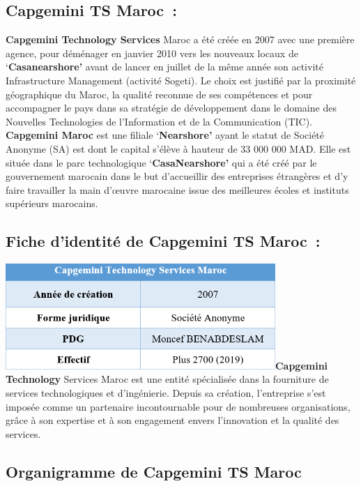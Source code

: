 \documentclass[12pt,a4paper,twoside]{report}
\begin{document}
\hypertarget{capgemini-ts-maroc}{%
\subsection{Capgemini TS Maroc~:}\label{capgemini-ts-maroc}}

\textbf{Capgemini Technology Services} Maroc a été créée en 2007 avec
une première agence, pour déménager en janvier 2010 vers les nouveaux
locaux de `\textbf{Casanearshore'} avant de lancer en juillet de la même
année son activité Infrastructure Management (activité Sogeti). Le choix
est justifié par la proximité géographique du Maroc, la qualité reconnue
de ses compétences et pour accompagner le pays dans sa stratégie de
développement dans le domaine des Nouvelles Technologies de
l'Information et de la Communication (TIC). \textbf{Capgemini Maroc} est
une filiale `\textbf{Nearshore'} ayant le statut de Société Anonyme (SA)
est dont le capital s'élève à hauteur de 33 000 000 MAD. Elle est située
dans le parc technologique `\textbf{CasaNearshore'} qui a été créé par
le gouvernement marocain dans le but d'accueillir des entreprises
étrangères et d'y faire travailler la main d'œuvre marocaine issue des
meilleures écoles et instituts supérieurs marocains.

\hypertarget{fiche-didentituxe9-de-capgemini-ts-maroc}{%
\subsection{Fiche d'identité de Capgemini TS
Maroc~:}\label{fiche-didentituxe9-de-capgemini-ts-maroc}}

\includegraphics[width=4.03056in,height=1.58056in]{latex_media/media/image4.png}\textbf{Capgemini
Technology} Services Maroc est une entité spécialisée dans la fourniture
de services technologiques et d'ingénierie. Depuis sa création,
l'entreprise s'est imposée comme un partenaire incontournable pour de
nombreuses organisations, grâce à son expertise et à son engagement
envers l'innovation et la qualité des services.

\hypertarget{organigramme-de-capgemini-ts-maroc}{%
\subsection{Organigramme de Capgemini TS
Maroc}\label{organigramme-de-capgemini-ts-maroc}}
\end{document}
